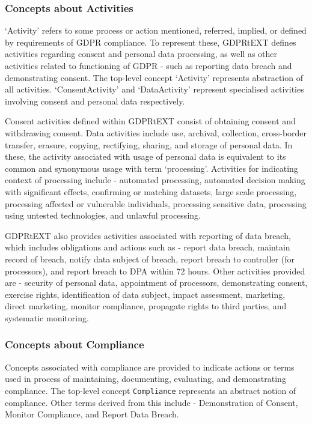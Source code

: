 \subsubsection{Concepts about Activities}
`Activity' refers to some process or action mentioned, referred, implied, or defined by requirements of GDPR compliance. To represent these, GDPRtEXT defines activities regarding consent and personal data processing, as well as other activities related to functioning of GDPR - such as reporting data breach and demonstrating consent. The top-level concept `Activity' represents abstraction of all activities. `ConsentActivity' and `DataActivity' represent specialised activities involving consent and personal data respectively.

Consent activities defined within GDPRtEXT consist of obtaining consent and withdrawing consent. Data activities include use, archival, collection, cross-border transfer, erasure, copying, rectifying, sharing, and storage of personal data. In these, the activity associated with usage of personal data is equivalent to its common and synonymous usage with term `processing'. Activities for indicating context of processing include - automated processing,  automated decision making with significant effects, confirming or matching datasets, large scale processing, processing affected or vulnerable individuals, processing sensitive data, processing using untested technologies, and unlawful processing.

GDPRtEXT also provides activities associated with reporting of data breach, which includes obligations and actions such as - report data breach, maintain record of breach, notify data subject of breach, report breach to controller (for processors), and report breach to DPA within 72 hours. Other activities provided are - security of personal data, appointment of processors, demonstrating consent, exercise rights, identification of data subject, impact assessment, marketing, direct marketing, monitor compliance, propagate rights to third parties, and systematic monitoring.

\subsubsection{Concepts about Compliance}
Concepts associated with compliance are provided to indicate actions or terms used in process of maintaining, documenting, evaluating, and demonstrating compliance. The top-level concept \texttt{Compliance} represents an abstract notion of compliance. Other terms derived from this include - Demonstration of Consent, Monitor Compliance, and Report Data Breach.

